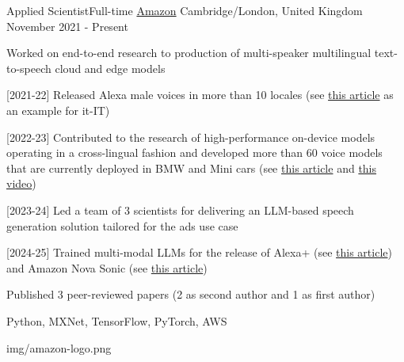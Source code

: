 
\begin{cventries}

  \logocventry
    {Applied Scientist{\enskip\cdotp\enskip}Full-time}
    {\href{https://www.amazon.com/}{Amazon}}
    {Cambridge/London, United Kingdom}
    {November 2021 - Present}
    {
      \begin{cvitems}
        \item {Worked on end-to-end research to production of multi-speaker multilingual text-to-speech cloud and edge models}
        \item {[2021-22] Released Alexa male voices in more than 10 locales (see \textcolor{blue}{\href{https://www.hdblog.it/casa/articoli/n562569/alexa-cambia-voce-maschile-femminile-come-fare/}{this article}} as an example for it-IT)}
        \item {[2022-23] Contributed to the research of high-performance on-device models operating in a cross-lingual fashion and developed more than 60 voice models that are currently deployed in BMW and Mini cars (see \textcolor{blue}{\href{https://www.aboutamazon.com/news/devices/amazon-bmw}{this article}} and \textcolor{blue}{\href{https://www.youtube.com/watch?v=qVOHZ-PsNXw}{this video}})}
        \item {[2023-24] Led a team of 3 scientists for delivering an LLM-based speech generation solution tailored for the ads use case}
        \item {[2024-25] Trained multi-modal LLMs for the release of Alexa+ (see \textcolor{blue}{\href{https://www.aboutamazon.com/news/devices/new-alexa-generative-artificial-intelligence}{this article}}) and Amazon Nova Sonic (see \textcolor{blue}{\href{https://www.aboutamazon.com/news/innovation-at-amazon/nova-sonic-voice-speech-foundation-model}{this article}})}
        \item {Published 3 peer-reviewed papers (2 as second author and 1 as first author)}
      \end{cvitems}
      \cvexptech
        {Python, MXNet, TensorFlow, PyTorch, AWS}
    }
    {img/amazon-logo.png}


\end{cventries}
